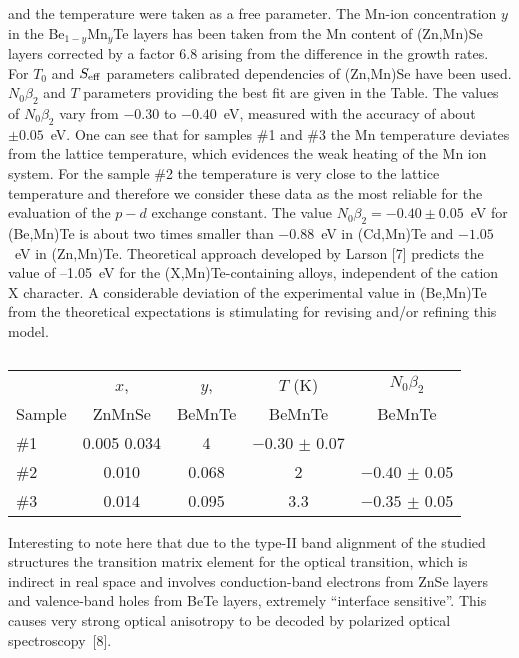 \documentclass[a4paper,draft]{book}
\begin{document}
and the temperature were taken as a free parameter.
The Mn-ion concentration $y$ in the Be$_{1-y}$Mn$_{y}$Te layers has been
taken from the Mn content of (Zn,Mn)Se layers corrected by a
factor 6.8 arising from the difference in the growth rates.
For $T_0 $ and $S_{\rm eff} $ parameters calibrated dependencies of
(Zn,Mn)Se have been used.
$N_0 \beta _2 $ and $T$ parameters providing the best fit are given in the Table.
The values of $N_0 \beta_2 $ vary from $-0.30$ to $-0.40$~eV, measured with the accuracy
of about $\pm 0.05$~eV.
One can see that for samples {\#}1 and {\#}3 the Mn temperature deviates from the lattice temperature,
which evidences the weak heating of the Mn ion system.
For the sample {\#}2 the temperature is very close to the lattice
temperature and therefore we consider these data as the most
reliable for the evaluation of the $p{-}d$ exchange constant.
The value $N_0 \beta_2 = -0.40\pm 0.05$~eV for (Be,Mn)Te is about two
times smaller than $-0.88$~eV in (Cd,Mn)Te and $-1.05$~eV in (Zn,Mn)Te.
Theoretical approach developed by Larson \etal{}
[7] predicts the value of --1.05~eV for the (X,Mn)Te-containing
alloys, independent of the cation X character.
A considerable deviation of the experimental value in (Be,Mn)Te from the
theoretical expectations is stimulating for revising and/or
refining this model.

\begin{table}[h]
\vspace{-12pt}
\caption{}
\begin{center}
\begin{tabular}
{lcccc}
\hline
                &$x$,       &$y$,       &$T$ (K)    &$N_0 \beta _2$  \\
Sample          &ZnMnSe     &BeMnTe     &BeMnTe     &BeMnTe\\
\hline
\vspace{4pt}
{\#}1           & 0.005      0.034     & 4         &$-0.30$ $\pm $ 0.07 \\
{\#}2           & 0.010     & 0.068     & 2         &$-0.40$ $\pm $ 0.05 \\
{\#}3           & 0.014     & 0.095     & 3.3       &$-0.35$ $\pm $ 0.05 \\
\hline
\end{tabular}
\end{center}
\vspace{-12pt}
\end{table}

Interesting to note here that due to the type-II band alignment of
the studied structures the transition matrix element for the
optical transition, which is indirect in real space and involves
conduction-band electrons from ZnSe layers and va\-len\-ce-band holes
from BeTe layers, extremely ``interface sensitive''. This causes
very strong optical anisotropy to be decoded by polarized optical
spectroscopy~[8].
\end{document}
